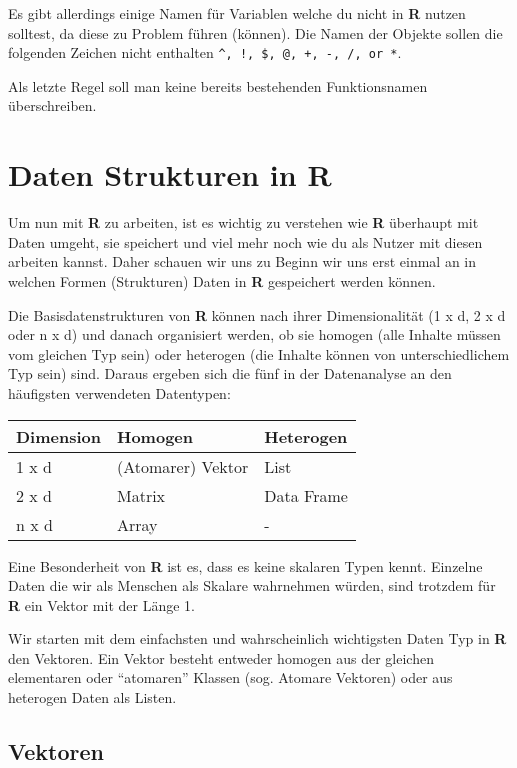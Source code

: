 \documentclass[
]{book}
\begin{document}
Es gibt allerdings einige Namen für Variablen welche du nicht in \textbf{R} nutzen solltest, da diese zu Problem führen (können).
Die Namen der Objekte sollen die folgenden Zeichen nicht enthalten \texttt{\^{},\ !,\ \$,\ @,\ +,\ -,\ /,\ or\ *}.

Als letzte Regel soll man keine bereits bestehenden Funktionsnamen überschreiben.

\hypertarget{daten-strukturen-in-r}{%
\chapter{Daten Strukturen in R}\label{daten-strukturen-in-r}}

Um nun mit \textbf{R} zu arbeiten, ist es wichtig zu verstehen wie \textbf{R} überhaupt mit Daten umgeht, sie speichert und viel mehr noch wie du als Nutzer mit diesen arbeiten kannst.
Daher schauen wir uns zu Beginn wir uns erst einmal an in welchen Formen (Strukturen) Daten in \textbf{R} gespeichert werden können.

Die Basisdatenstrukturen von \textbf{R} können nach ihrer Dimensionalität (1 x d, 2 x d oder n x d) und danach organisiert werden, ob sie homogen (alle Inhalte müssen vom gleichen Typ sein) oder heterogen (die Inhalte können von unterschiedlichem Typ sein) sind.
Daraus ergeben sich die fünf in der Datenanalyse an den häufigsten verwendeten Datentypen:

\begin{longtable}[]{@{}lll@{}}
\toprule
Dimension & Homogen & Heterogen\tabularnewline
\midrule
\endhead
1 x d & (Atomarer) Vektor & List\tabularnewline
2 x d & Matrix & Data Frame\tabularnewline
n x d & Array & -\tabularnewline
\bottomrule
\end{longtable}

Eine Besonderheit von \textbf{R} ist es, dass es keine skalaren Typen kennt.
Einzelne Daten die wir als Menschen als Skalare wahrnehmen würden, sind trotzdem für \textbf{R} ein Vektor mit der Länge 1.

Wir starten mit dem einfachsten und wahrscheinlich wichtigsten Daten Typ in \textbf{R} den Vektoren.
Ein Vektor besteht entweder homogen aus der gleichen elementaren oder ``atomaren'' Klassen (sog. Atomare Vektoren) oder aus heterogen Daten als Listen.

\hypertarget{vektoren}{%
\section{Vektoren}\label{vektoren}}
\end{document}
